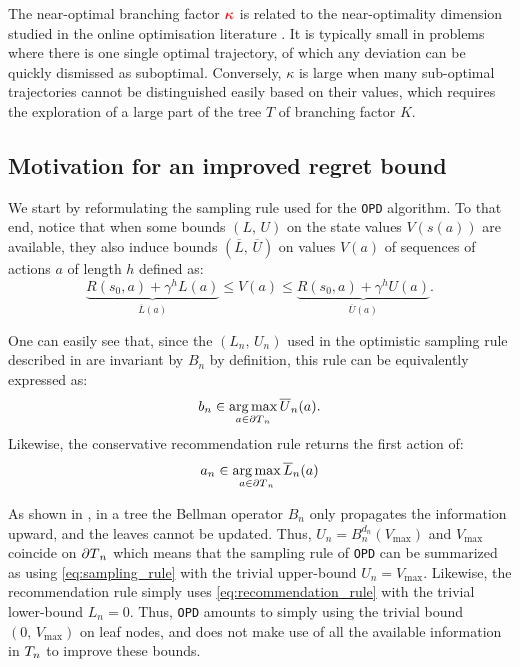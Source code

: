 \documentclass[runningheads]{llncs}
\begin{document}
The near-optimal branching factor $\hlrb{\kappa}$ is related \citep{Bubeck2010open} to the near-optimality dimension studied in the online optimisation literature \citep[see e.g.][]{Bubeck2009,Munos2011}.
It is typically small in problems where there is one single optimal trajectory, of which any deviation can be quickly dismissed as suboptimal. Conversely, $\kappa$ is large when many sub-optimal trajectories cannot be distinguished easily based on their values, which requires the exploration of a large part of the tree $T$ of branching factor $K$. 


\subsection{Motivation for an improved regret bound}

We start by reformulating the sampling rule used for the \texttt{OPD} algorithm. To that end, notice that when some bounds $(L,\,U)$ on the state values $V(s(a))$ are available, they also induce bounds $(\overline{L},\, \overline{U})$ on values $V(a)$ of sequences of actions $a$ of length $h$ defined as:
\begin{equation*}
\underbrace{R(s_0,a) + \gamma^{h} L(a)}_{\overline{L}(a)} \leq V(a) \leq \underbrace{R(s_0,a) + \gamma^{h} U(a)}_{\overline{U}(a)}.
\end{equation*}

One can easily see that, since the $(L_n,\,U_n)$ used in the optimistic sampling rule described in  are invariant by $B_n$ by definition, this rule can be equivalently expressed as:
\begin{equation}
\label{eq:sampling_rule}
b_n \in \operatorname*{arg\,max}_{a\in{\partial T}_n} \overline{U}_n(a).
\end{equation}
Likewise, the conservative recommendation rule returns the first action of:
\begin{equation}
\label{eq:recommendation_rule}
a_n \in \operatorname*{arg\,max}_{a\in{\partial T}_n} \overline{L}_n(a)
\end{equation}


As shown in , in a tree the Bellman operator $B_n$ only propagates the information upward, and the leaves cannot be updated. Thus, $U_n = B_n^{d_n}(V_{\max})$ and $V_{\max}$ coincide on ${\partial T}_n$ which means that the sampling rule of \texttt{OPD} can be summarized as using \eqref{eq:sampling_rule} with the trivial upper-bound $U_n = V_{\max}$.
Likewise, the recommendation rule simply uses \eqref{eq:recommendation_rule} with the trivial lower-bound $L_n = 0$. Thus, \texttt{OPD} amounts to simply using the trivial bound $(0,\, V_{\max})$ on leaf nodes, and does not make use of all the available information in $T_n$ to improve these bounds.
\end{document}

